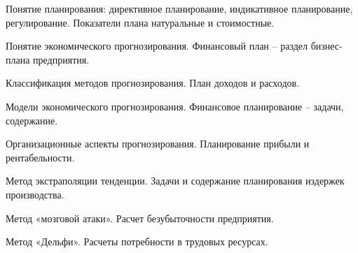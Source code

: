 \documentclass[
	14pt,
	a4paper,
	]
	{scrartcl}
\begin{document}
\shapk
{}
\setcounter{zad}{0}

\vfill
\z Понятие планирования: директивное планирование, индикативное планирование, регулирование.
 \vfill
\z Показатели плана натуральные и стоимостные. \vfill

\vfill

\newpage


\shapk
{}
\setcounter{zad}{0}

\vfill
\z Понятие экономического прогнозирования.
 \vfill
\z Финансовый план – раздел бизнес-плана предприятия.
 \vfill

\vfill

\newpage


\shapk
{}
\setcounter{zad}{0}

\vfill
\z Классификация методов прогнозирования.
 \vfill
\z План доходов и расходов.
 \vfill

\vfill

\newpage


\shapk
{}
\setcounter{zad}{0}

\vfill
\z Модели экономического прогнозирования.
 \vfill
\z Финансовое планирование – задачи, содержание.
 \vfill

\vfill

\newpage


\shapk
{}
\setcounter{zad}{0}

\vfill
\z Организационные аспекты прогнозирования.
 \vfill
\z Планирование прибыли и рентабельности.
 \vfill

\vfill

\newpage


\shapk
{}
\setcounter{zad}{0}

\vfill
\z Метод экстраполяции тенденции.
 \vfill
\z Задачи и содержание планирования издержек производства.
 \vfill

\vfill

\newpage


\shapk
{}
\setcounter{zad}{0}

\vfill
\z Метод «мозговой атаки».
 \vfill
\z Расчет безубыточности предприятия.
 \vfill

\vfill

\newpage


\shapk
{}
\setcounter{zad}{0}

\vfill
\z Метод «Дельфи».
 \vfill
\z Расчеты потребности в трудовых ресурсах.
 \vfill
\end{document}
